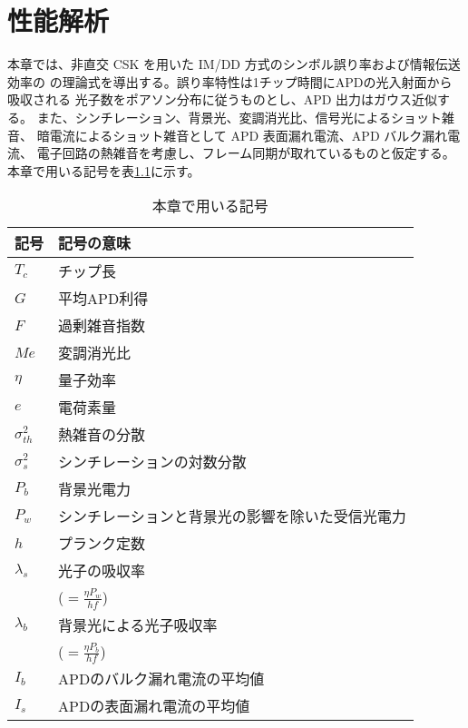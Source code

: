 ﻿\chapter{性能解析}
本章では、非直交 CSK を用いた IM/DD 方式のシンボル誤り率および情報伝送効率の
の理論式を導出する。誤り率特性は1チップ時間にAPDの光入射面から吸収される
光子数をポアソン分布に従うものとし、APD 出力はガウス近似する。
また、シンチレーション、背景光、変調消光比、信号光によるショット雑音、
暗電流によるショット雑音として APD 表面漏れ電流、APD バルク漏れ電流、
電子回路の熱雑音を考慮し、フレーム同期が取れているものと仮定する。
本章で用いる記号を表\ref{tbl:notations2}に示す。

%
\begin{center}
\begin{table}[hpbt]
 \caption{本章で用いる記号}
 \label{tbl:notations2}
 \begin{center}
  \begin{tabular}{l|l} \hline
記号 & 記号の意味 \\ \hline
$T_c$ & チップ長 \\
$G$ & 平均APD利得 \\
$F$ & 過剰雑音指数 \\
$Me$ & 変調消光比 \\ 
$\eta$ & 量子効率 \\
$e$ & 電荷素量 \\
$\sigma_{th}^2$ & 熱雑音の分散 \\
$\sigma_s^2$ & シンチレーションの対数分散 \\
$P_b$ & 背景光電力 \\
$P_w$ & シンチレーションと背景光の影響を除いた受信光電力 \\
$h$ & プランク定数 \\
$\lambda_s$ & 光子の吸収率 \\
 & ($=\frac{\eta P_w}{hf}$) \\
$\lambda_b$ & 背景光による光子吸収率 \\
 & ($=\frac{\eta P_b}{hf}$) \\
$I_b$ & APDのバルク漏れ電流の平均値 \\
$I_s$ & APDの表面漏れ電流の平均値 \\ \hline
  \end{tabular}
 \end{center}
\end{table}
\end{center}

